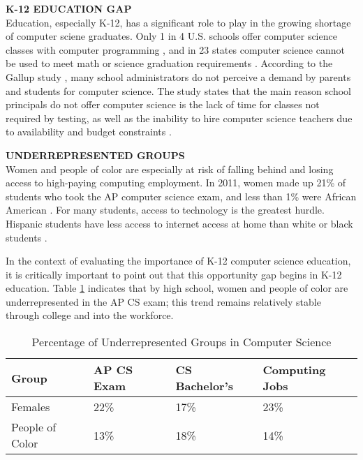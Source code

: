 \textbf{K-12 EDUCATION GAP} \\
Education, especially K-12, has a significant role to play in the growing shortage of computer sciene graduates. Only 1 in 4 U.S. schools offer computer science classes with computer programming \cite{gallup}, and in 23 states computer science cannot be used to meet math or science graduation requirements \cite{WSJref}. According to the Gallup study \cite{gallup}, many school administrators do not perceive a demand by parents and students for computer science. The study states that the main reason school principals do not offer computer science is the lack of time for classes not required by testing, as well as the inability to hire computer science teachers due to availability and budget constraints \cite{gallup}. \par 
\textbf{UNDERREPRESENTED GROUPS} \\
Women and people of color are especially at risk of falling behind and losing access to high-paying computing employment. In 2011, women made up 21\% of students who took the AP computer science exam, and less than 1\% were African American \cite{backtoschool}. For many students, access to technology is the greatest hurdle. Hispanic students have less access to internet access at home than white or black students \cite{gallup}. \par
In the context of evaluating the importance of K-12 computer science education, it is critically important to point out that this opportunity gap begins in K-12 education. Table \ref{tab:csgap} indicates that by high school, women and people of color are underrepresented in the AP CS exam; this trend remains relatively stable through college and into the workforce. \par
\begin{table}
	\centering
		\begin{tabular}{ | l | p{3cm}|p{3cm}|p{3cm}| } \hline
			\textbf{Group} & \textbf{AP CS Exam} & \textbf{CS Bachelor’s} & \textbf{Computing Jobs} \\ \hline
			Females & 22\% & 17\% & 23\% \\ \hline
			People of Color & 13\% & 18\% & 14\% \\ \hline
		\end{tabular}
		\caption{Percentage of Underrepresented Groups in Computer Science \cite{codeorgstats}} \label{tab:csgap} 
\end{table} 
			
